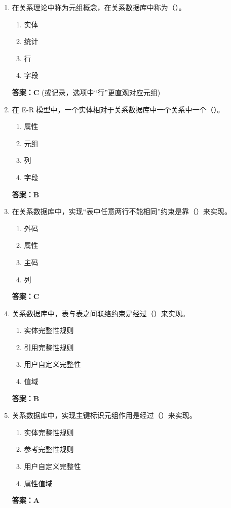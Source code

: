 \documentclass[12pt, a4paper]{article}
\begin{document}
\begin{enumerate}[label=\arabic*.]
    \item 在关系理论中称为元组概念，在关系数据库中称为（\quad）。
    \begin{enumerate}
        \item 实体
        \item 统计
        \item 行
        \item 字段
    \end{enumerate}
    \textbf{答案：C} (或记录，选项中“行”更直观对应元组)

    \item 在 E-R 模型中，一个实体相对于关系数据库中一个关系中一个（\quad）。
    \begin{enumerate}
        \item 属性
        \item 元组
        \item 列
        \item 字段
    \end{enumerate}
    \textbf{答案：B}

    \item 在关系数据库中，实现“表中任意两行不能相同”约束是靠（\quad）来实现。
    \begin{enumerate}
        \item 外码
        \item 属性
        \item 主码
        \item 列
    \end{enumerate}
    \textbf{答案：C}

    \item 关系数据库中，表与表之间联络约束是经过（\quad）来实现。
    \begin{enumerate}
        \item 实体完整性规则
        \item 引用完整性规则
        \item 用户自定义完整性
        \item 值域
    \end{enumerate}
    \textbf{答案：B}

    \item 关系数据库中，实现主键标识元组作用是经过（\quad）来实现。
    \begin{enumerate}
        \item 实体完整性规则
        \item 参考完整性规则
        \item 用户自定义完整性
        \item 属性值域
    \end{enumerate}
    \textbf{答案：A}


\end{enumerate}
\end{document}

